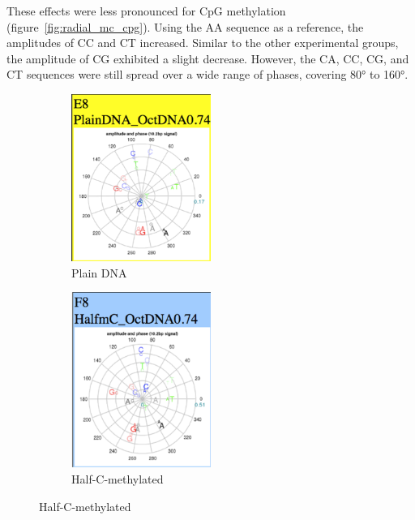 \documentclass[parskip=full, numbers=noenddot]{scrreprt}
\begin{document}
These effects were less pronounced for CpG methylation (figure~\ref{fig:radial_mc_cpg}). %
Using the AA sequence as a reference, the amplitudes of CC and CT increased.  Similar to the other experimental groups, the amplitude of CG exhibited a slight decrease.  However, the CA, CC, CG, and CT sequences were still spread over a wide range of phases, covering \ang{80} to \ang{160}.

\begin{figure}[htpb]
  \centering
  \begin{subfigure}[htpb]{0.5\textwidth}
    \centering
    \includegraphics[width=0.5\textwidth]{emsa_e8_radial}
    \caption{Plain DNA}
    \label{fig:radial_mc_plain}
  \end{subfigure}
  \begin{subfigure}[htpb]{0.5\textwidth}
    \centering
    \includegraphics[width=0.5\textwidth]{emsa_f8_radial}
    \caption{Half-C-methylated}
    \label{fig:radial_mc_halfmc}
  \end{subfigure}

\end{figure}
\end{document}
